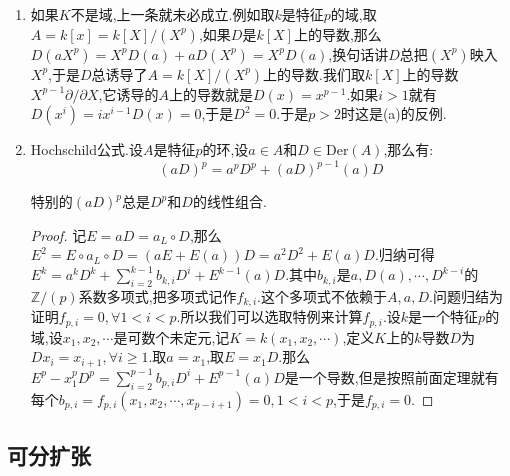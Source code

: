 \begin{enumerate}
\begin{proof}
		但是按照$1,D,\cdots,D^{p-1}$是线性无关的,就有$ic_iD(a)=0$,但是这矛盾.
	\end{proof}
	\item 如果$K$不是域,上一条就未必成立.例如取$k$是特征$p$的域,取$A=k[x]=k[X]/(X^p)$,如果$D$是$k[X]$上的导数,那么$D(aX^p)=X^pD(a)+aD(X^p)=X^pD(a)$,换句话讲$D$总把$(X^p)$映入$X^p$,于是$D$总诱导了$A=k[X]/(X^p)$上的导数.我们取$k[X]$上的导数$X^{p-1}\partial/\partial X$,它诱导的$A$上的导数就是$D(x)=x^{p-1}$.如果$i>1$就有$D(x^i)=ix^{i-1}D(x)=0$,于是$D^2=0$.于是$p>2$时这是(a)的反例.
	\item Hochschild公式.设$A$是特征$p$的环,设$a\in A$和$D\in\mathrm{Der}(A)$,那么有:
	$$(aD)^p=a^pD^p+(aD)^{p-1}(a)D$$
	
	特别的$(aD)^p$总是$D^p$和$D$的线性组合.
	\begin{proof}
		
		记$E=aD=a_L\circ D$,那么$E^2=E\circ a_L\circ D=(aE+E(a))D=a^2D^2+E(a)D$.归纳可得$E^k=a^kD^k+\sum_{i=2}^{k-1}b_{k,i}D^i+E^{k-1}(a)D$.其中$b_{k,i}$是$a,D(a),\cdots,D^{k-i}$的$\mathbb{Z}/(p)$系数多项式,把多项式记作$f_{k,i}$.这个多项式不依赖于$A,a,D$.问题归结为证明$f_{p,i}=0,\forall 1<i<p$.所以我们可以选取特例来计算$f_{p,i}$.设$k$是一个特征$p$的域,设$x_1,x_2,\cdots$是可数个未定元,记$K=k(x_1,x_2,\cdots)$,定义$K$上的$k$导数$D$为$Dx_i=x_{i+1},\forall i\ge1$.取$a=x_1$,取$E=x_1D$.那么$E^p-x_1^pD^p=\sum_{i=2}^{p-1}b_{p,i}D^i+E^{p-1}(a)D$是一个导数,但是按照前面定理就有每个$b_{p,i}=f_{p,i}(x_1,x_2,\cdots,x_{p-i+1})=0,1<i<p$,于是$f_{p,i}=0$.
	\end{proof}
\end{enumerate}
\newpage
\subsection{可分扩张}


